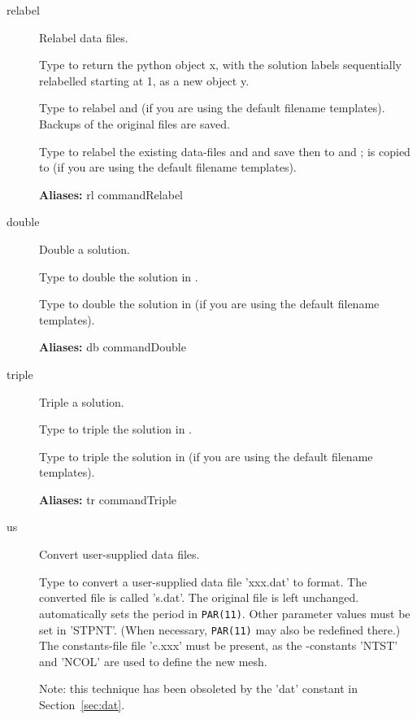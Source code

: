 \documentclass[12pt]{report}
\begin{document}
\begin{description}
\item[relabel]
Relabel data files.

    Type  to return the python object x, with the solution
    labels sequentially relabelled starting at 1, as a new object y.

    Type  to relabel  and  (if you are
    using the default filename templates).  Backups of the
    original files are saved.

    Type  to relabel the existing data-files
     and  and save then to  and
    ;  is copied to  (if you are using
    the default filename templates). 

\textbf{Aliases:} rl commandRelabel

\item[double]
Double a solution.

    Type  to double the solution in .

    Type  to double the solution in  (if you
    are using the default filename templates).
    
\textbf{Aliases:} db commandDouble

\item[triple]
Triple a solution.

    Type  to triple the solution in .

    Type  to triple the solution in  (if you
    are using the default filename templates).
    
\textbf{Aliases:} tr commandTriple

\item[us]
Convert user-supplied data files.

    Type  to convert a user-supplied data file 'xxx.dat' to
    \AUTO format. The converted file is called 's.dat'.  The original
    file is left unchanged.  \AUTO automatically sets the period in
    {\tt PAR(11)}.  Other parameter values must be set in 'STPNT'. (When
    necessary, {\tt PAR(11)} may also be redefined there.)  The
    constants-file file 'c.xxx' must be present, as the \AUTO-constants
    'NTST' and 'NCOL' are used to define the new mesh.

    Note: this technique has been obsoleted by the 'dat' \AUTO constant
    in Section~\ref{sec:dat}.
    

\end{description}
\end{document}
